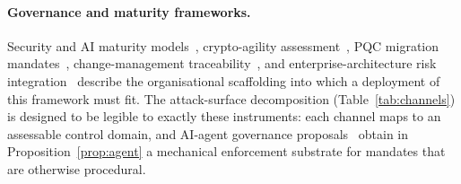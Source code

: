 \paragraph{Governance and maturity frameworks.}
Security and AI maturity
models~\cite{sok_ccmm_2024,mlsmm_2023,nist_ai_rmf_maturity_2024},
crypto-agility assessment~\cite{crypto_agility_maturity_2022},
PQC migration mandates~\cite{presman_govt_pqc_2024}, change-management
traceability~\cite{change_mgmt_traceability_2016}, and enterprise-architecture
risk integration~\cite{ea_security_togaf_2017} describe the organisational
scaffolding into which a deployment of this framework must fit. The
attack-surface decomposition (Table~\ref{tab:channels}) is designed to be
legible to exactly these instruments: each channel maps to an assessable
control domain, and AI-agent governance
proposals~\cite{ethos_ai_agents_2024,saura_llm_security_policies} obtain in
Proposition~\ref{prop:agent} a mechanical enforcement substrate for mandates
that are otherwise procedural.
